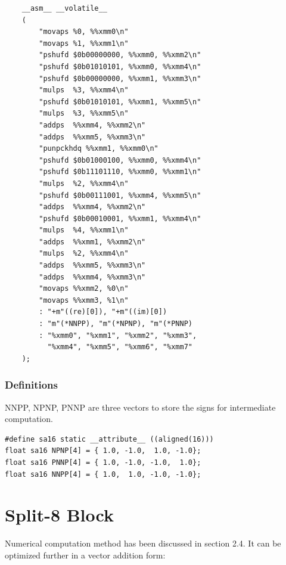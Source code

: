 \documentclass[a4paper]{report}
\begin{document}
    \lstset{language = c, tabsize = 4}
    \begin{lstlisting}
    __asm__ __volatile__
    (
        "movaps %0, %%xmm0\n"                  
        "movaps %1, %%xmm1\n"                  
        "pshufd $0b00000000, %%xmm0, %%xmm2\n" 
        "pshufd $0b01010101, %%xmm0, %%xmm4\n" 
        "pshufd $0b00000000, %%xmm1, %%xmm3\n" 
        "mulps  %3, %%xmm4\n"                  
        "pshufd $0b01010101, %%xmm1, %%xmm5\n" 
        "mulps  %3, %%xmm5\n"                  
        "addps  %%xmm4, %%xmm2\n"              
        "addps  %%xmm5, %%xmm3\n"              
        "punpckhdq %%xmm1, %%xmm0\n"           
        "pshufd $0b01000100, %%xmm0, %%xmm4\n" 
        "pshufd $0b11101110, %%xmm0, %%xmm1\n" 
        "mulps  %2, %%xmm4\n"                  
        "pshufd $0b00111001, %%xmm4, %%xmm5\n" 
        "addps  %%xmm4, %%xmm2\n"              
        "pshufd $0b00010001, %%xmm1, %%xmm4\n" 
        "mulps  %4, %%xmm1\n"                  
        "addps  %%xmm1, %%xmm2\n"              
        "mulps  %2, %%xmm4\n"                  
        "addps  %%xmm5, %%xmm3\n"              
        "addps  %%xmm4, %%xmm3\n"              
        "movaps %%xmm2, %0\n"                  
        "movaps %%xmm3, %1\n"                  
        : "+m"((re)[0]), "+m"((im)[0])         
        : "m"(*NNPP), "m"(*NPNP), "m"(*PNNP)   
        : "%xmm0", "%xmm1", "%xmm2", "%xmm3",  
          "%xmm4", "%xmm5", "%xmm6", "%xmm7"   
    );
    \end{lstlisting}

\subsubsection{Definitions} \indent

	NNPP, NPNP, PNNP are three vectors to store the signs for intermediate computation.

    \lstset{language = c, tabsize = 4}
    \begin{lstlisting}
#define sa16 static __attribute__ ((aligned(16)))
float sa16 NPNP[4] = { 1.0, -1.0,  1.0, -1.0};
float sa16 PNNP[4] = { 1.0, -1.0, -1.0,  1.0};
float sa16 NNPP[4] = { 1.0,  1.0, -1.0, -1.0};
    \end{lstlisting}

\section{Split-8 Block} \indent

	Numerical computation method has been discussed in section 2.4. It can be optimized further in a vector addition form:
\end{document}
